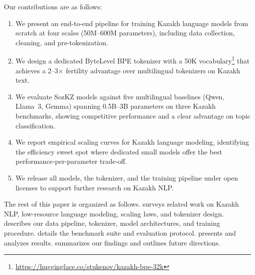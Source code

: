 Our contributions are as follows:
\begin{enumerate}
  \item We present an end-to-end pipeline for training Kazakh language
    models from scratch at four scales (50M--600M parameters), including
    data collection, cleaning, and pre-tokenization.
  \item We design a dedicated ByteLevel BPE tokenizer with a 50K
    vocabulary\footnote{\url{https://huggingface.co/stukenov/kazakh-bpe-32k}}
    that achieves a 2--3$\times$ fertility advantage over
    multilingual tokenizers on Kazakh text.
  \item We evaluate SozKZ models against five multilingual baselines
    (Qwen, Llama~3, Gemma) spanning 0.5B--3B parameters on three
    Kazakh benchmarks, showing competitive performance and a clear
    advantage on topic classification.
  \item We report empirical scaling curves for Kazakh language modeling,
    identifying the efficiency sweet spot where dedicated small models
    offer the best performance-per-parameter trade-off.
  \item We release all models, the tokenizer, and the training pipeline
    under open licenses to support further research on Kazakh NLP.
\end{enumerate}

The rest of this paper is organized as follows.
 surveys related work on Kazakh NLP, low-resource
language modeling, scaling laws, and tokenizer design.
 describes our data pipeline, tokenizer,
model architectures, and training procedure.
 details the benchmark suite and evaluation
protocol.   presents and analyzes results.
 summarizes our findings and outlines future
directions.
